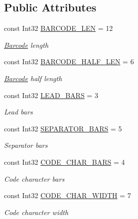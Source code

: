 \subsection*{Public Attributes}
\begin{DoxyCompactItemize}
\item 
const Int32 \hyperlink{class_pdf_file_writer_1_1_barcode_e_a_n13_ab2ae8a52d9dff5a33b5e8b1d5656c19c}{B\+A\+R\+C\+O\+D\+E\+\_\+\+L\+EN} = 12
\begin{DoxyCompactList}\small\item\em \hyperlink{class_pdf_file_writer_1_1_barcode}{Barcode} length \end{DoxyCompactList}\item 
const Int32 \hyperlink{class_pdf_file_writer_1_1_barcode_e_a_n13_a2f1605acb4691819c667dcef1c696c48}{B\+A\+R\+C\+O\+D\+E\+\_\+\+H\+A\+L\+F\+\_\+\+L\+EN} = 6
\begin{DoxyCompactList}\small\item\em \hyperlink{class_pdf_file_writer_1_1_barcode}{Barcode} half length \end{DoxyCompactList}\item 
const Int32 \hyperlink{class_pdf_file_writer_1_1_barcode_e_a_n13_ab823da95d829468f727ea96b07f06459}{L\+E\+A\+D\+\_\+\+B\+A\+RS} = 3
\begin{DoxyCompactList}\small\item\em Lead bars \end{DoxyCompactList}\item 
const Int32 \hyperlink{class_pdf_file_writer_1_1_barcode_e_a_n13_a85621ae6d8223c9cc2d6fd26c32a1c27}{S\+E\+P\+A\+R\+A\+T\+O\+R\+\_\+\+B\+A\+RS} = 5
\begin{DoxyCompactList}\small\item\em Separator bars \end{DoxyCompactList}\item 
const Int32 \hyperlink{class_pdf_file_writer_1_1_barcode_e_a_n13_ae2cf1a4e0585ae510e032f1c0133daa5}{C\+O\+D\+E\+\_\+\+C\+H\+A\+R\+\_\+\+B\+A\+RS} = 4
\begin{DoxyCompactList}\small\item\em Code character bars \end{DoxyCompactList}\item 
const Int32 \hyperlink{class_pdf_file_writer_1_1_barcode_e_a_n13_ae34b9936f0354b7072af583522efc49c}{C\+O\+D\+E\+\_\+\+C\+H\+A\+R\+\_\+\+W\+I\+D\+TH} = 7
\begin{DoxyCompactList}\small\item\em Code character width \end{DoxyCompactList}\end{DoxyCompactItemize}
